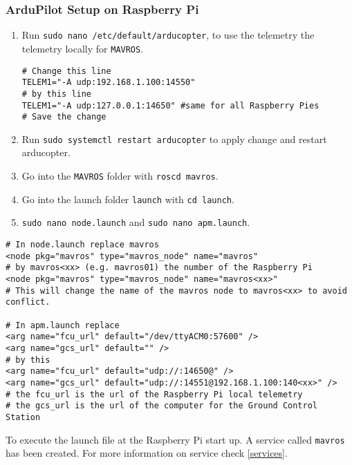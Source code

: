 \subsubsection{ArduPilot Setup on Raspberry Pi}
\begin{enumerate}
    \item Run \texttt{sudo nano /etc/default/arducopter}, to use the telemetry the telemetry locally for \texttt{MAVROS}.

          \begin{verbatim}
# Change this line
TELEM1="-A udp:192.168.1.100:14550"
# by this line
TELEM1="-A udp:127.0.0.1:14650" #same for all Raspberry Pies
# Save the change
          \end{verbatim}

    \item Run \texttt{sudo systemctl restart arducopter} to apply change and restart arducopter.
    \item Go into the \texttt{MAVROS} folder with \texttt{roscd mavros}.
    \item Go into the launch folder \texttt{launch} with \texttt{cd launch}.
    \item \texttt{sudo nano node.launch} and \texttt{sudo nano apm.launch}.
\end{enumerate}

\begin{verbatim}
# In node.launch replace mavros
<node pkg="mavros" type="mavros_node" name="mavros"
# by mavros<xx> (e.g. mavros01) the number of the Raspberry Pi
<node pkg="mavros" type="mavros_node" name="mavros<xx>"
# This will change the name of the mavros node to mavros<xx> to avoid conflict.

# In apm.launch replace
<arg name="fcu_url" default="/dev/ttyACM0:57600" />
<arg name="gcs_url" default="" />
# by this
<arg name="fcu_url" default="udp://:14650@" />
<arg name="gcs_url" default="udp://:14551@192.168.1.100:140<xx>" />
# the fcu_url is the url of the Raspberry Pi local telemetry
# the gcs_url is the url of the computer for the Ground Control Station
\end{verbatim}

To execute the launch file at the Raspberry Pi start up. A service called \texttt{mavros} has been created.
For more information on service check \ref{services}.

